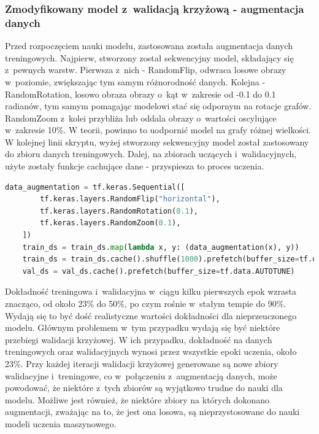 \subsubsection{Zmodyfikowany model z~walidacją krzyżową - augmentacja danych}

Przed rozpoczęciem nauki modelu, zastosowana została augmentacja danych treningowych.
Najpierw, stworzony został sekwencyjny model, składający się z~pewnych warstw.
Pierwsza z~nich - RandomFlip, odwraca losowe obrazy w~poziomie, zwiększając tym samym różnorodność danych.
Kolejna - RandomRotation, losowo obraza obrazy o~kąt w~zakresie od -0.1 do 0.1 radianów,
tym samym pomagając modelowi stać się odpornym na rotacje grafów.
RandomZoom z~kolei przybliża lub oddala obrazy o~wartości oscylujące w~zakresie 10\%.
W teorii, powinno to uodpornić model na grafy różnej wielkości.
W kolejnej linii skryptu, wyżej stworzony sekwencyjny model został zastosowany do zbioru danych treningowych.
Dalej, na zbiorach uczących i~walidacyjnych, użyte zostały funkcje cachujące dane - przyspiesza to proces uczenia.


\begin{lstlisting}[language=Python,caption=Listing zmodyfikowanego skryptu poprzedzającego tworzenie modelu z~walidacją krzyżową
	- wersja 3,label={tests-model-crossval3}]
	data_augmentation = tf.keras.Sequential([
        tf.keras.layers.RandomFlip("horizontal"),
        tf.keras.layers.RandomRotation(0.1),
        tf.keras.layers.RandomZoom(0.1),
    ])
    train_ds = train_ds.map(lambda x, y: (data_augmentation(x), y))
    train_ds = train_ds.cache().shuffle(1000).prefetch(buffer_size=tf.data.AUTOTUNE)
    val_ds = val_ds.cache().prefetch(buffer_size=tf.data.AUTOTUNE)
\end{lstlisting}

Dokładność treningowa i~walidacyjna w~ciągu kilku pierwszych epok wzrasta znacząco,
od około 23\% do 50\%, po czym rośnie w~stałym tempie do 90\%.
Wydają się to być dość realistyczne wartości dokładności dla nieprzeuczonego modelu.
Głównym problemem w~tym przypadku wydają się być niektóre przebiegi walidacji krzyżowej.
W ich przypadku, dokładność na danych treningowych oraz walidacyjnych wynosi przez wszystkie epoki uczenia, około 23\%.
Przy każdej iteracji walidacji krzyżowej generowane są nowe zbiory walidacyjne i~treningowe,
co w~połączeniu z~augmentacją danych, może powodować, że niektóre z~tych zbiorów są wyjątkowo trudne do nauki dla modelu.
Możliwe jest również, że niektóre zbiory na których dokonano augmentacji, zważając na to, że jest ona losowa,
są nieprzystosowane do nauki modeli uczenia maszynowego.

